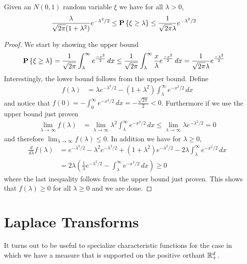 \begin{lem}\label{GaussianTailsElementary}Given an $N(0,1)$ random
  variable $\xi$ we have for all $\lambda > 0$, 
\begin{align*}
\frac{\lambda}{\sqrt{2\pi}(1+\lambda^2)} e^{-\lambda^2/2}&\leq \textbf{P}\left \{\xi \geq
    \lambda \right \} \leq \frac{1}{\sqrt{2\pi} \lambda} e^{-\lambda^2/2}
\end{align*}
\end{lem}
\begin{proof}
We start by showing the upper bound 
\begin{align*}
\textbf{P}\left \{\xi \geq \lambda \right \} &= \frac{1}{\sqrt{2\pi}} \int_\lambda^\infty
e^{\frac{-x^2}{2}} \, dx 
\leq  \frac{1}{\sqrt{2\pi}} \int_\lambda^\infty
\frac{x}{\lambda} e^{\frac{-x^2}{2}} \, dx 
= \frac{1}{\sqrt{2\pi}\lambda} e^{\frac{-\lambda^2}{2}}
\end{align*}
Interestingly, the lower bound follows from the upper bound.  Define 
\begin{align*}
f(\lambda) &= \lambda e^{-\lambda^2/2} - (1 + \lambda^2)
\int_\lambda^\infty e^{-x^2/2} \, dx
\end{align*}
and notice that $f(0) = -\int_0^\infty e^{-x^2/2} \, dx =
-\frac{\sqrt{2\pi}}{2} < 0$.  Furthermore if we use the upper bound
just proven
\begin{align*}
\lim_{\lambda \to \infty} f(\lambda)
&= \lim_{\lambda \to \infty} \lambda^2 \int_\lambda^\infty e^{-x^2/2}
\, dx \leq \lim_{\lambda \to \infty} \lambda e^{-\lambda^2/2} = 0
\end{align*}
and therefore $\lim_{\lambda \to \infty} f(\lambda) \leq 0$.  In addition
we have for $\lambda \geq 0$,
\begin{align*}
\frac{d}{d\lambda} f(\lambda) &= e^{-\lambda^2/2} - \lambda^2
e^{-\lambda^2/2} + (1+\lambda^2) e^{-\lambda^2/2} -2\lambda
\int_\lambda^\infty e^{-x^2/2} \, dx \\
&=2\lambda \left(\frac{1}{\lambda}e^{-\lambda^2/2} -
  \int_\lambda^\infty e^{-x^2/2} \, dx \right ) \geq 0
\end{align*}
where the last inequality follows from the upper bound just proven.
This shows that $f(\lambda) \geq 0$ for all $\lambda \geq 0$ and we
are done.
\end{proof}

\section{Laplace Transforms}
It turns out to be useful to specialize characteristic functions for
the case in which we have a measure that is supported on the positive
orthant $\mathbb{R}^d_+$.  

